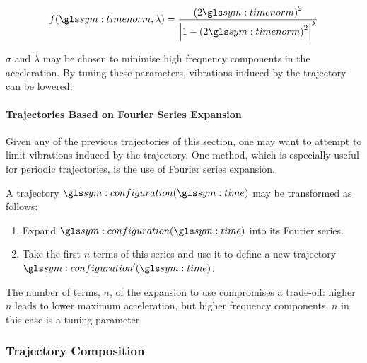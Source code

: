 				\begin{equation}
					f(\timenorm, \lambda) =
						\frac
						{%
							{(2\timenorm)}^2
						}
						{%
							{%
								\left|
									1 - {(2\timenorm)}^2
								\right|
							}^\lambda
						}
				\end{equation}

				$\sigma$ and $\lambda$ may be chosen to
				minimise high frequency components in the acceleration. By
				tuning these parameters, vibrations induced by the trajectory
				can be lowered.

			\paragraph{Trajectories Based on Fourier Series Expansion}%
			\label{trajectories_based_on_fourier_series_expansion}

				Given any of the previous trajectories of this section, one may
				want to attempt to limit vibrations induced by the trajectory.
				One method, which is especially useful for periodic
				trajectories, is the use of Fourier series expansion.

				A trajectory $\configuration(\timesym)$ may be transformed as
				follows:

				\begin{enumerate}

					\item

						Expand $\configuration(\timesym)$ into its Fourier
						series.

					\item

						Take the first $n$ terms of this series and use it to
						define a new trajectory $\configuration'(\timesym)$.
				\end{enumerate}

				The number of terms, $n$, of the expansion to use compromises a
				trade-off: higher $n$ leads to lower maximum acceleration, but
				higher frequency components. $n$ in this case is a tuning
				parameter.

		\subsubsection{Trajectory Composition}%
		\label{sec:trajetory_composition}


